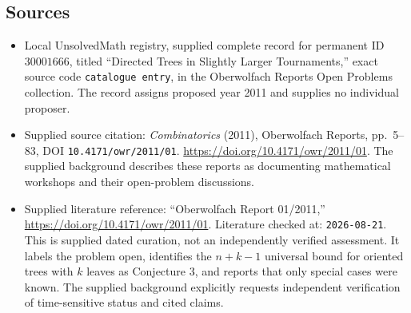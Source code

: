 \documentclass[11pt]{article}
\begin{document}
\subsection{Sources}
\begin{itemize}
\item Local UnsolvedMath registry, supplied complete record for permanent ID \(30001666\), titled ``Directed Trees in Slightly Larger Tournaments,'' exact source code \texttt{catalogue entry}, in the Oberwolfach Reports Open Problems collection. The record assigns proposed year 2011 and supplies no individual proposer.
\item Supplied source citation: \emph{Combinatorics} (2011), Oberwolfach Reports, pp.\ 5--83, DOI \texttt{10.4171/owr/2011/01}. \url{https://doi.org/10.4171/owr/2011/01}. The supplied background describes these reports as documenting mathematical workshops and their open-problem discussions.
\item Supplied literature reference: ``Oberwolfach Report 01/2011,'' \url{https://doi.org/10.4171/owr/2011/01}. Literature checked at: \texttt{2026-08-21}. This is supplied dated curation, not an independently verified assessment. It labels the problem open, identifies the \(n+k-1\) universal bound for oriented trees with \(k\) leaves as Conjecture 3, and reports that only special cases were known. The supplied background explicitly requests independent verification of time-sensitive status and cited claims.
\end{itemize}
\end{document}
